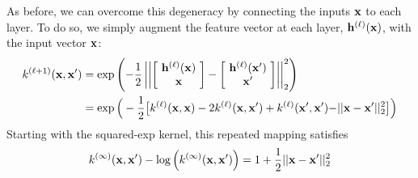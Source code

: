 As before, we can overcome this degeneracy by connecting the inputs ${\bf{x}}$ to each layer.  To do so, we simply augment the feature vector at each layer, ${\bf{h}}^{(\ell)}({\bf{x}})$, with the input vector ${\bf{x}}$:
%
\begin{align}
 k^{(\ell + 1)}(\vx, \vx') %
& = \exp \left( -\frac{1}{2} \left|\left| \left[ \! \begin{array}{c} \hPhi^{(\ell)}(\vx) \\ {\color{black} \vx} \end{array} \! \right]  - \left[ \! \begin{array}{c} \hPhi^{(\ell)}(\vx') \\ {\color{black} \vx'} \end{array} \! \right] \right| \right|_2^2 \right) \nonumber \\
& = \exp \Big( -\frac{1}{2} \big[ k^{(\ell)}(\vx, \vx) - 2 k^{(\ell)}(\vx, \vx') %
 + k^{(\ell)}(\vx', \vx') {\color{black} - || \vx - \vx' ||_2^2} \big] \Big)
\end{align}
%
Starting with the squared-exp kernel, this repeated mapping satisfies
\begin{align}
k^{(\infty)}({\bf{x}}, {\bf{x}}') - \log \left( k^{(\infty)}({\bf{x}}, {\bf{x}}') \right) = 1 + \frac{1}{2} || {\bf{x}} - {\bf{x}}' ||_2^2
\end{align}
%
